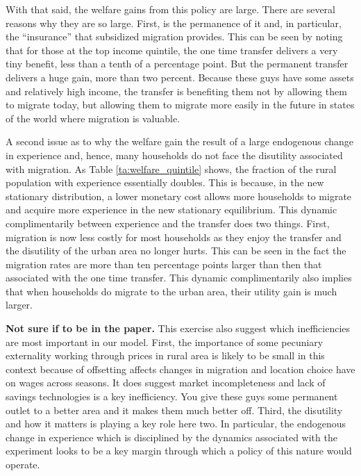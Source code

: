 \documentclass[pdftex,11pt]{article}
\begin{document}
With that said, the welfare gains from this policy are large. There are several reasons why they are so large. First, is the permanence of it and, in particular, the ``insurance'' that subsidized migration provides. This can be seen by noting that for those at the top income quintile, the one time transfer delivers a very tiny benefit, less than a tenth of a percentage point. But the permanent transfer delivers a huge gain, more than two percent. Because these guys have some assets and relatively high income, the transfer is benefiting them not by allowing them to migrate today, but allowing them to migrate more easily in the future in states of the world where migration is valuable.

A second issue as to why the welfare gain the result of a large endogenous change in experience and, hence, many households do not face the disutility associated with migration.  As Table \ref{ta:welfare_quintile} shows, the fraction of the rural population with experience essentially doubles. This is because, in the new stationary distribution, a lower monetary cost allows more households to migrate and acquire more experience in the new stationary equilibrium. This dynamic complimentarily between experience and the transfer does two things. First, migration is now less costly for most households as they enjoy the transfer and the disutility of the urban area no longer hurts. This can be seen in the fact the migration rates are more than ten percentage points larger than then that associated with the one time transfer. This dynamic complimentarily also implies that when households do migrate to the urban area, their utility gain is much larger. 

\textbf{Not sure if to be in the paper. } This exercise also suggest which inefficiencies are most important in our model. First, the importance of some pecuniary externality working through prices in rural area is likely to be small in this context because of offsetting affects changes in migration and location choice have on wages across seasons.  It does suggest market incompleteness and lack of savings technologies is a key inefficiency. You give these guys some permanent outlet to a better area and it makes them much better off. Third, the disutility and how it matters is playing a key role here two. In particular, the endogenous change in experience which is disciplined by the dynamics associated with the experiment looks to be a key margin through which a policy of this nature would operate. 
\end{document}
